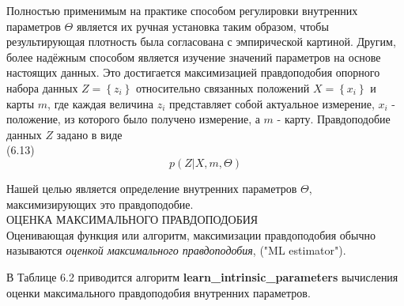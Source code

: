 \documentclass[10pt,a4paper]{article}
\begin{document}
Полностью применимым на практике способом регулировки внутренних параметров $\varTheta$ является их ручная установка таким образом, чтобы результирующая плотность была согласована с эмпирической картиной.
Другим, более надёжным способом является изучение значений параметров на основе настоящих данных.
Это достигается максимизацией правдоподобия опорного набора данных $Z = \left\lbrace z_i\right\rbrace $
относительно связанных положений $X = \left\lbrace x_i\right\rbrace $ и карты $m$, где каждая величина $z_i$ представляет собой актуальное измерение, $x_i$ - положение, из которого было получено измерение, а $m$ - карту. Правдоподобие данных $Z$ задано в виде\\

(6.13)
$$p(Z|X,m,\varTheta)$$

Нашей целью является определение внутренних параметров $\varTheta$, максимизирующих это правдоподобие.\\
ОЦЕНКА МАКСИМАЛЬНОГО ПРАВДОПОДОБИЯ\\ 
Оценивающая функция или алгоритм, максимизации правдоподобия обычно называются 
\textit{оценкой максимального правдоподобия}, ("ML estimator").

В Таблице 6.2 приводится алгоритм \textbf{learn\_intrinsic\_parameters} вычисления оценки максимального правдоподобия внутренних параметров. 
\end{document}
